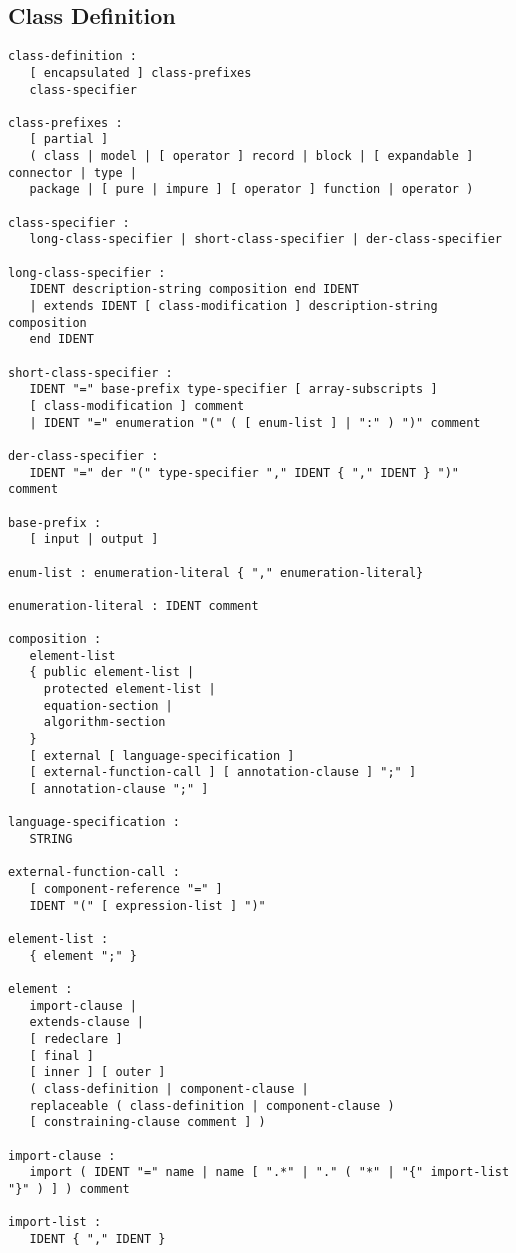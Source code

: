 \subsection{Class Definition}
\begin{lstlisting}[language=grammar]
class-definition :
   [ encapsulated ] class-prefixes
   class-specifier

class-prefixes :
   [ partial ]
   ( class | model | [ operator ] record | block | [ expandable ] connector | type |
   package | [ pure | impure ] [ operator ] function | operator )

class-specifier :
   long-class-specifier | short-class-specifier | der-class-specifier

long-class-specifier :
   IDENT description-string composition end IDENT
   | extends IDENT [ class-modification ] description-string composition
   end IDENT

short-class-specifier :
   IDENT "=" base-prefix type-specifier [ array-subscripts ]
   [ class-modification ] comment
   | IDENT "=" enumeration "(" ( [ enum-list ] | ":" ) ")" comment

der-class-specifier :
   IDENT "=" der "(" type-specifier "," IDENT { "," IDENT } ")" comment

base-prefix :
   [ input | output ]

enum-list : enumeration-literal { "," enumeration-literal}

enumeration-literal : IDENT comment

composition :
   element-list
   { public element-list |
     protected element-list |
     equation-section |
     algorithm-section
   }
   [ external [ language-specification ]
   [ external-function-call ] [ annotation-clause ] ";" ]
   [ annotation-clause ";" ]

language-specification :
   STRING

external-function-call :
   [ component-reference "=" ]
   IDENT "(" [ expression-list ] ")"

element-list :
   { element ";" }

element :
   import-clause |
   extends-clause |
   [ redeclare ]
   [ final ]
   [ inner ] [ outer ]
   ( class-definition | component-clause |
   replaceable ( class-definition | component-clause )
   [ constraining-clause comment ] )

import-clause :
   import ( IDENT "=" name | name [ ".*" | "." ( "*" | "{" import-list "}" ) ] ) comment

import-list :
   IDENT { "," IDENT }
\end{lstlisting}

